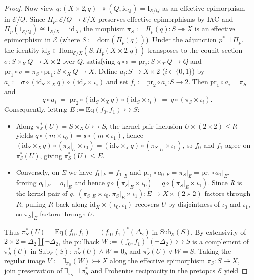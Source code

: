 \begin{proof}
Now view $q : (X \times 2, q) \twoheadrightarrow (Q, \mathrm{id}_Q) = 1_{\mathcal{E}/Q}$ as an effective epimorphism in $\mathcal{E}/Q$. Since $\Pi_p : \mathcal{E}/Q \to \mathcal{E}/X$ preserves effective epimorphisms by $\mathrm{IAC}$ and $\Pi_p(1_{\mathcal{E}/Q}) \cong 1_{\mathcal{E}/X} = \mathrm{id}_X$, the morphism $\pi_S := \Pi_p(q) : S \twoheadrightarrow X$ is an effective epimorphism in $\mathcal{E}$ (where $S := \mathrm{dom}(\Pi_p(q))$). Under the adjunction $p^* \dashv \Pi_p$, the identity $\mathrm{id}_S \in \mathrm{Hom}_{\mathcal{E}/X}(S, \Pi_p(X \times 2, q))$ transposes to the counit section $\sigma : S \times_X Q \to X \times 2$ over $Q$, satisfying $q \circ \sigma = \mathrm{pr}_2 : S \times_X Q \to Q$ and $\mathrm{pr}_1 \circ \sigma = \pi_S \circ \mathrm{pr}_1 : S \times_X Q \to X$. Define $a_i : S \to X \times 2$ ($i \in \{0,1\}$) by $a_i := \sigma \circ (\mathrm{id}_S \times_X q) \circ (\mathrm{id}_S \times \iota_i)$ and set $f_i := \mathrm{pr}_2 \circ a_i : S \to 2$. Then $\mathrm{pr}_1 \circ a_i = \pi_S$ and
\[
  q \circ a_i \;=\; \mathrm{pr}_2 \circ (\mathrm{id}_S \times_X q) \circ (\mathrm{id}_S \times \iota_i) \;=\; q \circ (\pi_S \times \iota_i).
\]
Consequently, letting $E := \mathrm{Eq}(f_0, f_1) \rightarrowtail S$:
\begin{itemize}
  \item Along $\pi_S^*(U) = S \times_X U \rightarrowtail S$, the kernel-pair inclusion $U \times (2 \times 2) \le R$ yields $q \circ (m \times \iota_0) = q \circ (m \times \iota_1)$, hence $(\mathrm{id}_S \times_X q) \circ (\pi_S|_U \times \iota_0) = (\mathrm{id}_S \times_X q) \circ (\pi_S|_U \times \iota_1)$, so $f_0$ and $f_1$ agree on $\pi_S^*(U)$, giving $\pi_S^*(U) \le E$.
  \item Conversely, on $E$ we have $f_0|_E = f_1|_E$ and $\mathrm{pr}_1 \circ a_0|_E = \pi_S|_E = \mathrm{pr}_1 \circ a_1|_E$, forcing $a_0|_E = a_1|_E$ and hence $q \circ (\pi_S|_E \times \iota_0) = q \circ (\pi_S|_E \times \iota_1)$. Since $R$ is the kernel pair of $q$, $(\pi_S|_E \times \iota_0, \pi_S|_E \times \iota_1) : E \to X \times (2 \times 2)$ factors through $R$; pulling $R$ back along $\mathrm{id}_X \times (\iota_0, \iota_1)$ recovers $U$ by disjointness of $\iota_0$ and $\iota_1$, so $\pi_S|_E$ factors through $U$.
\end{itemize}
Thus $\pi_S^*(U) = \mathrm{Eq}(f_0, f_1) = (f_0, f_1)^*(\Delta_2)$ in $\mathrm{Sub}_{\mathcal{E}}(S)$. By extensivity of $2 \times 2 = \Delta_2 \amalg \neg\Delta_2$, the pullback $W := (f_0, f_1)^*(\neg\Delta_2) \rightarrowtail S$ is a complement of $\pi_S^*(U)$ in $\mathrm{Sub}_{\mathcal{E}}(S)$: $\pi_S^*(U) \wedge W = 0_S$ and $\pi_S^*(U) \vee W = S$. Taking the regular image $V := \exists_{\pi_S}(W) \rightarrowtail X$ along the effective epimorphism $\pi_S : S \twoheadrightarrow X$, join preservation of $\exists_{\pi_S} \dashv \pi_S^*$ and Frobenius reciprocity in the pretopos $\mathcal{E}$ yield

\end{proof}
